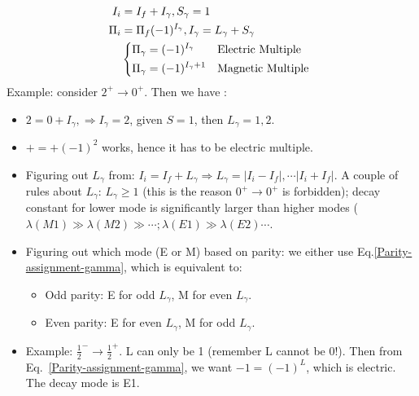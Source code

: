 \documentclass{school-22.101-notes}
\begin{document}
\begin{align}
I_i &= I_f + I_{\gamma}, S_{\gamma} = 1 \\
\Pi_i &= \Pi_f (-1)^{I_{\gamma}}, I_{\gamma} = L_{\gamma} + S_{\gamma} \\
&\begin{dcases*}
\Pi_{\gamma} = (-1)^{I_{\gamma}} & Electric Multiple \\
\Pi_{\gamma} = (-1)^{I_{\gamma} +1 } & Magnetic Multiple
\end{dcases*} \label{Parity-assignment-gamma}
\end{align}
Example: consider $2^+ \to 0^+$. Then we have : 
\begin{itemize}
\item $2 = 0 + I_{\gamma}, \Rightarrow I_{\gamma} = 2$, given $S=1$, then $L_{\gamma} = 1,2$. 
\item $+ = +(-1)^{2}$ works, hence it has to be electric multiple. 
\end{itemize}
\begin{itemize}
\item Figuring out $L_{\gamma}$ from: $I_i = I_f + L_{\gamma} \Rightarrow L_{\gamma} = |I_i - I_f|, \cdots |I_i + I_f|$. A couple of rules about $L_{\gamma}$: $L_{\gamma} \ge 1$ (this is the reason $0^+ \to 0^+$ is forbidden); decay constant for lower mode is significantly larger than higher modes ($\lambda (M1) \gg \lambda(M2) \gg \cdots; \lambda(E1) \gg \lambda(E2) \cdots$.
\item Figuring out which mode (E or M) based on parity: we either use Eq.\ref{Parity-assignment-gamma}, which is equivalent to:
    \begin{itemize}
    \item Odd parity: E for odd $L_{\gamma}$, M for even $L_{\gamma}$. 
    \item Even parity: E for even $L_{\gamma}$, M for odd $L_{\gamma}$. 
    \end{itemize}
\item Example: $\frac{1}{2}^- \to \frac{1}{2}^+$. L can only be 1 (remember L cannot be 0!). Then from Eq.~\ref{Parity-assignment-gamma}, we want $-1 = (-1)^L$, which is electric. The decay mode is E1. 
\end{itemize}
\end{document}

